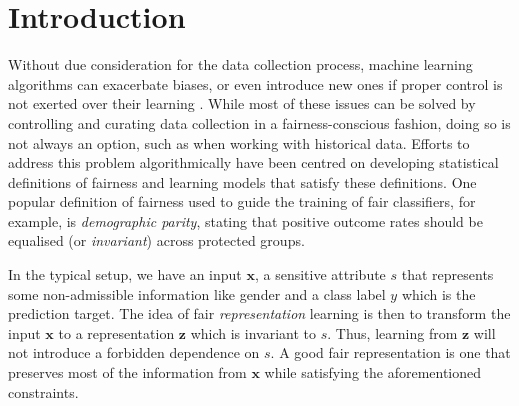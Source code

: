 \section{Introduction}

Without due consideration for the data collection process, machine learning algorithms can exacerbate biases, or even introduce new ones if proper control is not exerted over their learning \citep{holstein2019improving}. 
While most of these issues can be solved by
controlling and curating data collection in a fairness-conscious fashion, 
doing so is not always an option, such as when working with historical data.
Efforts to address this problem algorithmically have been centred on developing statistical definitions of fairness and learning models that satisfy these definitions.
One popular definition of fairness used to guide the training of fair classifiers, for example, is \emph{demographic parity}, stating that positive outcome rates should be equalised (or \emph{invariant}) across protected groups.

In the typical setup, we have an input $\bm{x}$, a sensitive attribute $s$ that represents some non-admissible information like gender
and a class label $y$ which is the prediction target.
The idea of fair \emph{representation} learning \citep{ZemWuSwePitetal13,edwards2016censoring,madras2018learning}
is then to transform the input $\bm{x}$ to a representation $\bm{z}$ which is invariant to $s$.
Thus, learning from $\bm{z}$ will not introduce a forbidden dependence on $s$.
A good fair representation is one that preserves most of the information from $\bm{x}$ while satisfying the aforementioned constraints.

